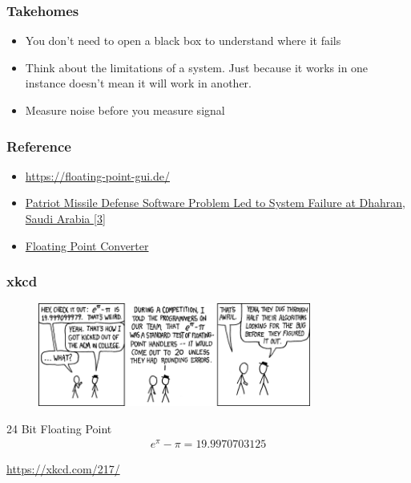 \documentclass[10pt]{beamer}
\begin{document}
\begin{frame}
    \frametitle{Takehomes}
    \begin{itemize}
        \item You don't need to open a black box to understand where it fails
        \item Think about the limitations of a system. Just because it works in one instance doesn't mean it will work in another.
        \item Measure noise before you measure signal
    \end{itemize}
\end{frame}
\begin{frame}
    \frametitle{Reference}
    
    
    \cite{Goldberg_1991}
    \cite{8766229}
    \begin{itemize}
        \item \color{cyan}\href{https://floating-point-gui.de/}{https://floating-point-gui.de/}
        \item \href{https://www.gao.gov/products/imtec-92-26}{Patriot Missile Defense Software Problem Led to System Failure at Dhahran, Saudi Arabia [3]}
        \item \href{https://www.h-schmidt.net/FloatConverter/IEEE754.html}{Floating Point Converter}
    \end{itemize}
\end{frame}
\begin{frame}
    \frametitle{xkcd}
    \begin{figure}
        \centering
        \includegraphics[width=0.8\textwidth]{xkcd.png}
    \end{figure}
    24 Bit Floating Point
    \begin{align*}
        e^\pi - \pi = 19.9970703125
    \end{align*}

    \href{https://xkcd.com/217/}{https://xkcd.com/217/}
\end{frame}
\end{document}
